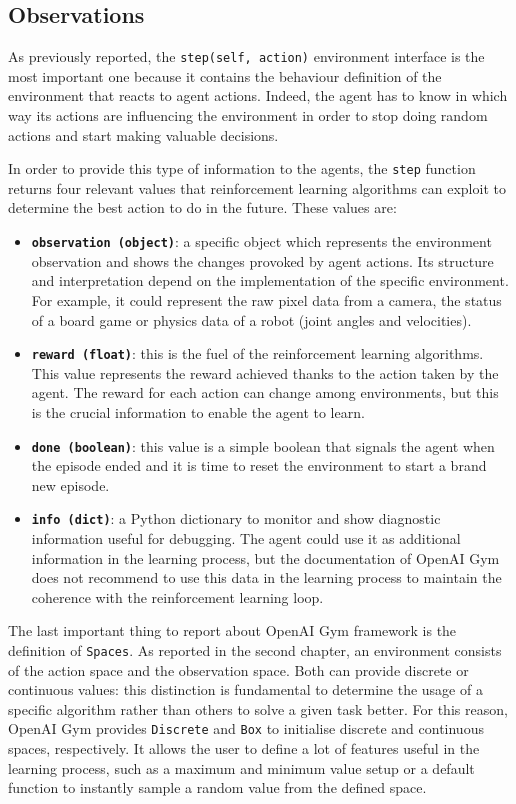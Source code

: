 \subsection{Observations} \label{subsec:observations}

As previously reported, the \texttt{step(self, action)} environment interface is the most important one because it contains the behaviour definition of the environment that reacts to agent actions.
Indeed, the agent has to know in which way its actions are influencing the environment in order to stop doing random actions and start making valuable decisions.

In order to provide this type of information to the agents, the \texttt{step} function returns four relevant values that reinforcement learning algorithms can exploit to determine the best action to do in the future.
These values are:
\begin{itemize}
	\item \textbf{\texttt{observation (object)}}: a specific object which represents the environment observation and shows the changes provoked by agent actions. Its structure and interpretation depend on the implementation of the specific environment. For example, it could represent the raw pixel data from a camera, the status of a board game or physics data of a robot (joint angles and velocities).
	\item \textbf{\texttt{reward (float)}}: this is the fuel of the reinforcement learning algorithms. This value represents the reward achieved thanks to the action taken by the agent. The reward for each action can change among environments, but this is the crucial information to enable the agent to learn.
	\item \textbf{\texttt{done (boolean)}}: this value is a simple boolean that signals the agent when the episode ended and it is time to reset the environment to start a brand new episode.
	\item \textbf{\texttt{info (dict)}}: a Python dictionary to monitor and show diagnostic information useful for debugging. The agent could use it as additional information in the learning process, but the documentation of OpenAI Gym does not recommend to use this data in the learning process to maintain the coherence with the reinforcement learning loop.
\end{itemize}

The last important thing to report about OpenAI Gym framework is the definition of \texttt{Spaces}. As reported in the second chapter, an environment consists of the action space and the observation space. Both can provide discrete or continuous values: this distinction is fundamental to determine the usage of a specific algorithm rather than others to solve a given task better. For this reason, OpenAI Gym provides \texttt{Discrete} and \texttt{Box} to initialise discrete and continuous spaces, respectively. It allows the user to define a lot of features useful in the learning process, such as a maximum and minimum value setup or a default function to instantly sample a random value from the defined space.

